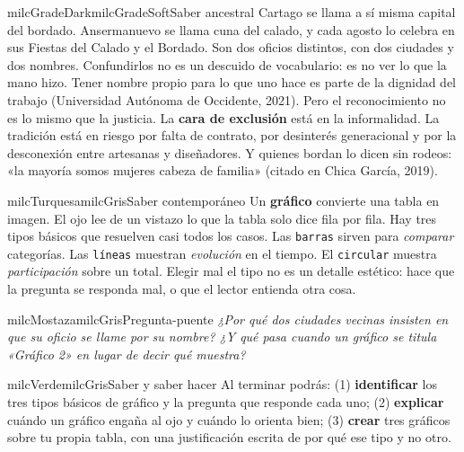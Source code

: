 \documentclass[11pt,letterpaper]{article}
\begin{document}
\begin{softbox}{milcGradeDark}{milcGradeSoft}{Saber ancestral}
Cartago se llama a sí misma capital del bordado. Ansermanuevo se llama cuna del calado, y cada agosto lo celebra en sus Fiestas del Calado y el Bordado. Son dos oficios distintos, con dos ciudades y dos nombres. Confundirlos no es un descuido de vocabulario: es no ver lo que la mano hizo. Tener nombre propio para lo que uno hace es parte de la dignidad del trabajo (Universidad Autónoma de Occidente, 2021). Pero el reconocimiento no es lo mismo que la justicia. La \textbf{cara de exclusión} está en la informalidad. La tradición está en riesgo por falta de contrato, por desinterés generacional y por la desconexión entre artesanas y diseñadores. Y quienes bordan lo dicen sin rodeos: «la mayoría somos mujeres cabeza de familia» (citado en Chica García, 2019).\par{}
\end{softbox}

\begin{softbox}{milcTurquesa}{milcGris}{Saber contemporáneo}
Un \textbf{gráfico} convierte una tabla en imagen. El ojo lee de un vistazo lo que la tabla solo dice fila por fila. Hay tres tipos básicos que resuelven casi todos los casos. Las \texttt{barras} sirven para \emph{comparar} categorías. Las \texttt{líneas} muestran \emph{evolución} en el tiempo. El \texttt{circular} muestra \emph{participación} sobre un total. Elegir mal el tipo no es un detalle estético: hace que la pregunta se responda mal, o que el lector entienda otra cosa.
\end{softbox}

\begin{softbox}{milcMostaza}{milcGris}{Pregunta-puente}
\textit{¿Por qué dos ciudades vecinas insisten en que su oficio se llame por su nombre? ¿Y qué pasa cuando un gráfico se titula «Gráfico 2» en lugar de decir qué muestra?}
\end{softbox}

\begin{softbox}{milcVerde}{milcGris}{Saber y saber hacer}
Al terminar podrás: (1) \textbf{identificar} los tres tipos básicos de gráfico y la pregunta que responde cada uno; (2) \textbf{explicar} cuándo un gráfico engaña al ojo y cuándo lo orienta bien; (3) \textbf{crear} tres gráficos sobre tu propia tabla, con una justificación escrita de por qué ese tipo y no otro.
\end{softbox}
\end{document}
